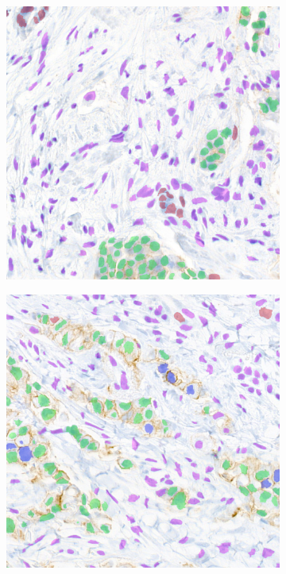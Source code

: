 \begin{figure}[H]
    \centering
    \begin{subfigure}[b]{0.3\textwidth}
    \includegraphics[width=\textwidth]{imgs/qual/breast/gt1.overlay.png}
    \label{fig:breast-gt1}
  \end{subfigure}
  \begin{subfigure}[b]{0.3\textwidth}
    \includegraphics[width=\textwidth]{imgs/qual/breast/gt2.overlay.png}

\end{subfigure}
\end{figure}
